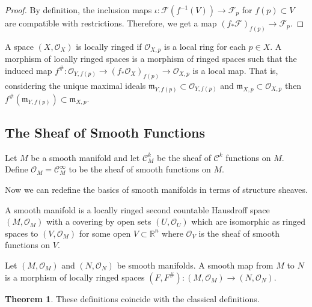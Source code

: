 \documentclass[12pt]{extarticle}
\newcommand{\R}{\mathbb{R}}
\theoremstyle{definition}
\newtheorem{theorem}{Theorem}[section]
\newenvironment{definition}[1][Definition:]{\begin{trivlist}
\item[\hskip \labelsep {\bfseries #1}]}{\end{trivlist}}
\newcommand{\C}[1]{\mathcal{C}^{#1}}
\newcommand{\F}{\mathcal{F}}
\renewcommand{\O}{\mathcal{O}}
\begin{document}
\begin{proof}
By definition, the inclusion maps $\iota : \F(f^{-1}(V)) \to \F_p$ for $f(p) \subset V$ are compatible with restrictions. Therefore, we get a map $(f_* \F)_{f(p)} \to \F_p$.  
\end{proof}

\begin{definition}
A space $(X, \O_X)$ is locally ringed if $\O_{X,p}$ is a local ring for each $p \in X$. A morphism of locally ringed spaces is a morphism of ringed spaces such that the induced map $f^{\#} : \O_{Y,f(p)} \to (f_* \O_X)_{f(p)} \to \O_{X, p}$ is a local map. That is, considering the unique maximal ideals $\mathfrak{m}_{Y, f(p)} \subset \O_{Y,f(p)}$ and  $\mathfrak{m}_{X, p} \subset \O_{X, p}$ then $f^{\#}(\mathfrak{m}_{Y, f(p)}) \subset \mathfrak{m}_{X, p}$.   
\end{definition}

\subsection{The Sheaf of Smooth Functions}

\begin{definition}
Let $M$ be a smooth manifold and let $\C{k}_M$ be the sheaf of $\C{k}$ functions on $M$. Define $\O_M = \C{\infty}_M$ to be the sheaf of smooth functions on $M$.
\end{definition}


Now we can redefine the basics of smooth manifolds in terms of structure sheaves.

\begin{definition}

\end{definition}

\begin{definition}
A smooth manifold is a locally ringed second countable Hausdroff space $(M, \O_M)$ with a covering by open sets $(U, \O_U)$ which are isomorphic as ringed spaces to $(V, \O_M)$ for some open $V \subset \R^n$ where $\O_V$ is the sheaf of smooth functions on $V$.  
\end{definition}

\begin{definition}
Let $(M, \O_M)$ and $(N, \O_N)$ be smooth manifolds. A smooth map from $M$ to $N$ is a morphism of locally ringed spaces $(F, F^{\#}) : (M, \O_M) \to (N, \O_N)$. 
\end{definition}

\begin{theorem}
These definitions coincide with the classical definitions. 
\end{theorem}
\end{document}
